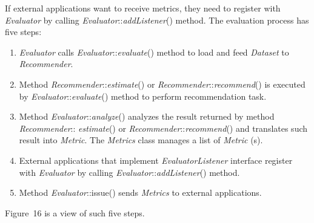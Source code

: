 \documentclass[a4paper]{llncs}
\begin{document}
If external applications want to receive metrics, they need to register with \textit{Evaluator} by calling \textit{Evaluator}::\textit{addListener}() method. The evaluation process has five steps:
\begin{enumerate}
\item \textit{Evaluator} calls \textit{Evaluator}::\textit{evaluate}() method to load and feed \textit{Dataset} to \textit{Recommender}.
\item Method \textit{Recommender}::\textit{estimate}() or \textit{Recommender}::\textit{recommend}() is executed by \textit{Evaluator}::\textit{evaluate}() method to perform recommendation task.
\item Method \textit{Evaluator}::\textit{analyze}() analyzes the result returned by method \textit{Recommender}:: \textit{estimate}() or \textit{Recommender}::\textit{recommend}() and translates such result into \textit{Metric}. The \textit{Metrics} class manages a list of \textit{Metric} (s).
\item External applications that implement \textit{EvaluatorListener} interface register with \textit{Evaluator} by calling \textit{Evaluator}::\textit{addListener}() method.
\item Method \textit{Evaluator}::issue() sends \textit{Metrics} to external applications.
\end{enumerate}
Figure~16 is a view of such five steps.
\end{document}
